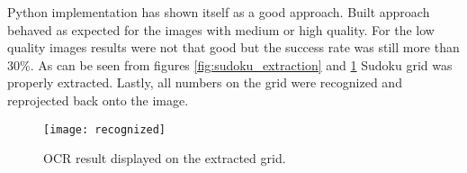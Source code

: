 \documentclass[../../main]{subfiles}
\begin{document}
Python implementation has shown itself as a good approach. Built approach behaved as expected for the images with medium or high quality. For the low quality images results were not that good but the success rate was still more than 30\%. As can be seen from figures \ref{fig:sudoku_extraction} and \ref{fig:sudoku_ocr} Sudoku grid was properly extracted. Lastly, all numbers on the grid were recognized and reprojected back onto the image.

\begin{figure} [ht!]
    \begin{center}
        \texttt{[image: recognized]}
        \caption{OCR result displayed on the extracted grid.}
        \label{fig:sudoku_ocr}
    \end{center}
\end{figure}
\end{document}
